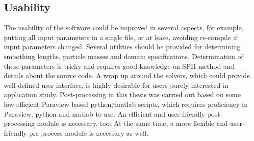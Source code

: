 \subsection{Usability}
The usability of the software could be improved in several aspects, for example, putting all input parameters in a single file, or at lease, avoiding re-compile if input parameters changed. Several utilities should be provided for determining smoothing lengths, particle masses and domain specifications. Determination of these parameters is tricky and requires good knowledge on SPH method and details about the source code.
A wrap up around the solvers, which could provide well-defined user interface, is highly desirable for users purely interested in application study. Post-processing in this thesis was carried out based on some low-efficient Paraview-based python/matlab scripts, which requires proficiency in Paraview, python and matlab to use. An efficient and user-friendly post-processing module is necessary, too. At the same time, a more flexible and user-friendly pre-process module is necessary as well. 


